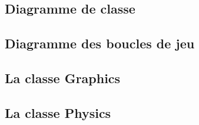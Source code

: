 \subsection{Diagramme de classe}


\subsection{Diagramme des boucles de jeu}


\subsection{La classe Graphics}


\subsection{La classe Physics}
